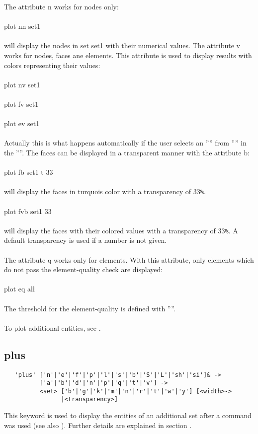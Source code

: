 \documentclass{article}
\begin{document}
The attribute n works for nodes only:\\\\plot nn set1\\\\will display the nodes in set set1 with their numerical values. The attribute v works for nodes, faces ane elements. This attribute is used to display results with colors representing their values:\\\\plot nv set1\\\\plot fv set1\\\\plot ev set1\\\\Actually this is what happens automatically if the user selects an '''' from '''' in the ''''. The faces can be displayed in a transparent manner with the attribute b:\\\\plot fb set1 t 33\\\\will display the faces in turquois color with a transparency of 33\verb_%_.\\\\plot fvb set1 33\\\\will display the faces with their colored values with a transparency of 33\verb_%_. A default transparency is used if a number is not given.\\\\
The attribute q works only for elements. With this attribute, only elements which do not pass the element-quality check are displayed:\\\\
plot eq all\\\\ The threshold for the element-quality is defined with ''''.\\\\
To plot additional entities, see .

\subsection{\label{plus}plus}
\begin{verbatim}
   'plus' ['n'|'e'|'f'|'p'|'l'|'s'|'b'|'S'|'L'|'sh'|'si']& ->
          ['a'|'b'|'d'|'n'|'p'|'q'|'t'|'v'] ->
          <set> ['b'|'g'|'k'|'m'|'n'|'r'|'t'|'w'|'y'] [<width>->
                |<transparency>] 
\end{verbatim}
This keyword is used to display the entities of an additional set after a  command was used (see also ). Further details are explained in section .
\end{document}
